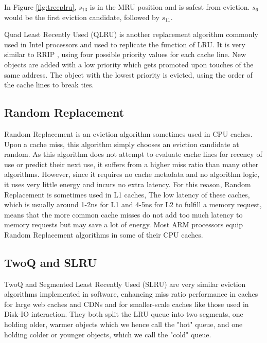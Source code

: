 \documentclass[letterpaper, twocolumn]{article}
\begin{document}
In Figure \ref{fig:treeplru}, 
$s_{13}$ is in the MRU position and is safest from eviction.
$s_6$ would be the first eviction candidate,
followed by $s_{11}$.

Quad Least Recently Used (QLRU) is another replacement algorithm
commonly used in Intel processors and used to replicate the function of LRU.
It is very similar to RRIP \cite{RRIP}, using four possible priority values for each cache line.
New objects are added with a low priority which gets promoted upon touches of the same address.
The object with the lowest priority is evicted, using the order of the cache lines to break ties.

\subsection{Random Replacement}

Random Replacement is an eviction algorithm sometimes used in CPU caches.
Upon a cache miss, this algorithm simply chooses an eviction candidate at random.
As this algorithm does not attempt to evaluate cache lines for recency of use
or predict their next use, it suffers from a higher miss ratio than many other algorithms.
However, since it requires no cache metadata and no algorithm logic,
it uses very little energy and incurs no extra latency.
For this reason, Random Replacement is sometimes used in L1 caches,
The low latency of these caches, which is usually around 1-2ns for L1
and 4-5ns for L2 to fulfill a memory request,
means that the more common cache misses do not add too much latency to memory requests
but may save a lot of energy.
Most ARM processors equip Random Replacement algorithms in some of their CPU caches.

\subsection{TwoQ and SLRU}

TwoQ \cite{TwoQ} and Segmented Least Recently Used (SLRU) \cite{SLRU}
are very similar eviction algorithms implemented in software,
enhancing miss ratio performance in caches for large web caches and CDNs
and for smaller-scale caches like those used in Disk-IO interaction.
They both split the LRU queue into two segments, one holding older, warmer objects
which we hence call the "hot" queue,
and one holding colder or younger objects,
which we call the "cold" queue.
\end{document}
